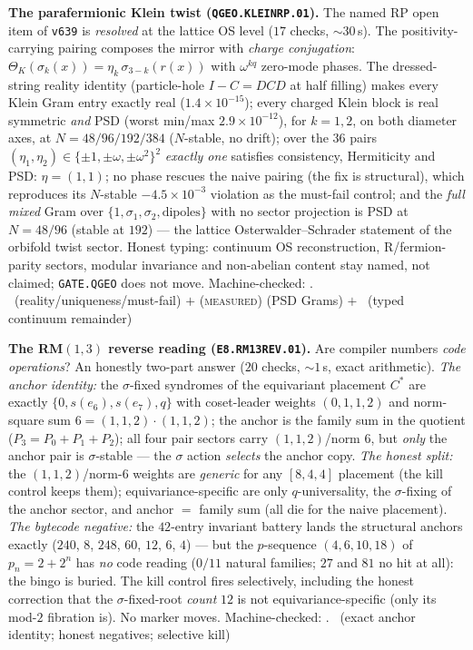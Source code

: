 \documentclass[11pt,a4paper]{article}
\theoremstyle{definition}
\begin{document}
\par\smallskip\noindent\textbf{The parafermionic Klein twist
(\texttt{QGEO.KLEINRP.01}).}
The named RP open item of \texttt{v639} is \emph{resolved} at the
lattice OS level ($17$ checks, ${\sim}30$\,s).  The
positivity-carrying pairing composes the mirror with \emph{charge
conjugation}: $\Theta_K(\sigma_k(x))=\eta_k\,\sigma_{3-k}(r(x))$ with
$\omega^{kq}$ zero-mode phases.  The dressed-string reality identity
(particle-hole $I-C=DCD$ at half filling) makes every Klein Gram entry
exactly real ($1.4\times10^{-15}$); every charged Klein block is real
symmetric \emph{and} PSD (worst min/max $2.9\times10^{-12}$), for
$k=1,2$, on both diameter axes, at $N=48/96/192/384$ ($N$-stable, no
drift); over the $36$ pairs $(\eta_1,\eta_2)\in\{\pm1,\pm\omega,
\pm\omega^2\}^2$ \emph{exactly one} satisfies consistency,
Hermiticity and PSD: $\eta=(1,1)$; no phase rescues the naive pairing
(the fix is structural), which reproduces its $N$-stable
$-4.5\times10^{-3}$ violation as the must-fail control; and the
\emph{full mixed} Gram over $\{1,\sigma_1,\sigma_2,
\text{dipoles}\}$ with no sector projection is PSD at $N=48/96$
(stable at $192$) --- the lattice Osterwalder--Schrader statement of
the orbifold twist sector.  Honest typing: continuum OS
reconstruction, R/fermion-parity sectors, modular invariance and
non-abelian content stay named, not claimed; \texttt{GATE.QGEO} does
not move.
Machine-checked: .
\mE\ (reality/uniqueness/must-fail) $+$ (\textsc{measured}) (PSD
Grams) $+$ \mC\ (typed continuum remainder)
\par\smallskip

\par\smallskip\noindent\textbf{The RM$(1,3)$ reverse reading
(\texttt{E8.RM13REV.01}).}
Are compiler numbers \emph{code operations}?  An honestly two-part
answer ($20$ checks, ${\sim}1$\,s, exact arithmetic).  \emph{The
anchor identity:} the $\sigma$-fixed syndromes of the equivariant
placement $C^*$ are exactly $\{0,s(e_6),s(e_7),q\}$ with coset-leader
weights $(0,1,1,2)$ and norm-square sum $6=(1,1,2)\cdot(1,1,2)$; the
anchor is the family sum in the quotient ($P_3=P_0{+}P_1{+}P_2$); all
four pair sectors carry $(1,1,2)$/norm $6$, but \emph{only} the anchor
pair is $\sigma$-stable --- the $\sigma$ action \emph{selects} the
anchor copy.  \emph{The honest split:} the $(1,1,2)$/norm-$6$ weights
are \emph{generic} for any $[8,4,4]$ placement (the kill control keeps
them); equivariance-specific are only $q$-universality, the
$\sigma$-fixing of the anchor sector, and anchor $=$ family sum (all
die for the naive placement).  \emph{The bytecode negative:} the
$42$-entry invariant battery lands the structural anchors exactly
($240$, $8$, $248$, $60$, $12$, $6$, $4$) --- but the $p$-sequence
$(4,6,10,18)$ of $p_n=2+2^n$ has \emph{no} code reading ($0/11$
natural families; $27$ and $81$ no hit at all): the bingo is buried.
The kill control fires selectively, including the honest correction
that the $\sigma$-fixed-root \emph{count} $12$ is not
equivariance-specific (only its mod-$2$ fibration is).  No marker
moves.
Machine-checked: .
\mE\ (exact anchor identity; honest negatives; selective kill)
\par\smallskip
\end{document}
